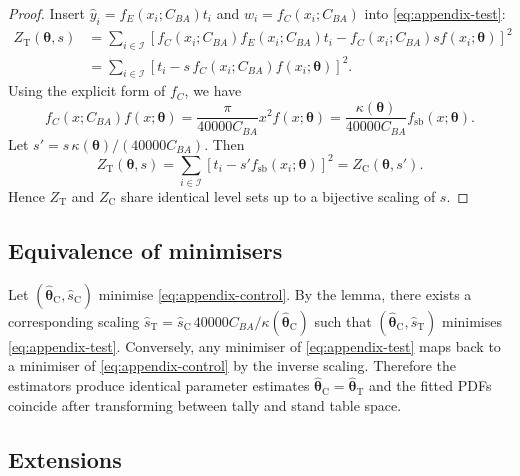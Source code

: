 \documentclass[12pt]{article}
\begin{document}
\begin{proof}
Insert $\hat{y}_i = f_E(x_i; C_{BA}) t_i$ and $w_i = f_C(x_i; C_{BA})$ into
\eqref{eq:appendix-test}:
\begin{align}
  Z_{\mathrm{T}}(\boldsymbol{\theta}, s)
    &= \sum_{i \in \mathcal{I}} \left[f_C(x_i; C_{BA}) f_E(x_i; C_{BA}) t_i
      - f_C(x_i; C_{BA}) s f(x_i; \boldsymbol{\theta})\right]^2 \\
    &= \sum_{i \in \mathcal{I}} \left[t_i - s \, f_C(x_i; C_{BA}) f(x_i; \boldsymbol{\theta})\right]^2.
\end{align}
Using the explicit form of $f_C$, we have
\begin{equation}
  f_C(x; C_{BA}) f(x; \boldsymbol{\theta})
  =
  \frac{\pi}{40000 C_{BA}} x^{2} f(x;\boldsymbol{\theta})
  =
  \frac{\kappa(\boldsymbol{\theta})}{40000 C_{BA}} f_{\mathrm{sb}}(x; \boldsymbol{\theta}).
\end{equation}
Let $s' = s\, \kappa(\boldsymbol{\theta})/(40000 C_{BA})$. Then
\begin{equation}
  Z_{\mathrm{T}}(\boldsymbol{\theta}, s)
  =
  \sum_{i \in \mathcal{I}} \left[t_i - s' f_{\mathrm{sb}}(x_i; \boldsymbol{\theta})\right]^2
  =
  Z_{\mathrm{C}}(\boldsymbol{\theta}, s').
\end{equation}
Hence $Z_{\mathrm{T}}$ and $Z_{\mathrm{C}}$ share identical level sets up to a
bijective scaling of $s$.
\end{proof}

\subsection{Equivalence of minimisers}

Let $(\hat{\boldsymbol{\theta}}_{\mathrm{C}}, \hat{s}_{\mathrm{C}})$ minimise
\eqref{eq:appendix-control}. By the lemma, there exists a corresponding scaling
$\hat{s}_{\mathrm{T}} = \hat{s}_{\mathrm{C}}\, 40000 C_{BA}/\kappa(\hat{\boldsymbol{\theta}}_{\mathrm{C}})$
such that $(\hat{\boldsymbol{\theta}}_{\mathrm{C}}, \hat{s}_{\mathrm{T}})$ minimises
\eqref{eq:appendix-test}. Conversely, any minimiser of
\eqref{eq:appendix-test} maps back to a minimiser of \eqref{eq:appendix-control}
by the inverse scaling. Therefore the estimators produce identical parameter
estimates $\hat{\boldsymbol{\theta}}_{\mathrm{C}} = \hat{\boldsymbol{\theta}}_{\mathrm{T}}$ and
the fitted PDFs coincide after transforming between tally and stand table space.

\subsection{Extensions}
\end{document}
